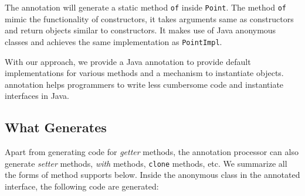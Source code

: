 
The \mixin annotation will generate a static method \texttt{of} inside
\texttt{Point}. The method \texttt{of} mimic the functionality of constructors,
it takes arguments same as constructors and return objects similar to
constructors. It makes use of Java anonymous classes and achieves the same
implementation as \texttt{PointImpl}. 

With our approach, we provide a Java annotation \mixin to provide default
implementations for various methods and a mechanism to instantiate
objects. \mixin annotation helps programmers to write less cumbersome code and
instantiate interfaces in Java. 


\subsection{What  \mixin Generates}
Apart from generating code for \emph{getter} methods, the annotation processor
can also generate \emph{setter} methods, \emph{with} methods, \texttt{clone}
methods, etc. We summarize all the forms of method \mixin  supports below. Inside
the anonymous class in the annotated interface, the following code are
generated:

